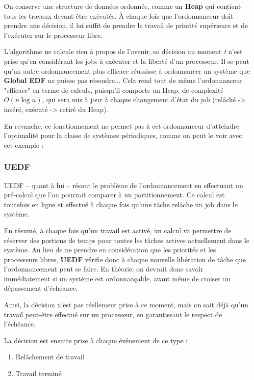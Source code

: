 		
		On conserve une structure de données 
		ordonnée, comme un \textbf{Heap}  qui contient tous les travaux
		devant être exécutés. À chaque fois que l'ordonnanceur doit prendre 
		une décision, il lui suffit de prendre le travail de priorité supérieure et 
		de l'exécuter sur le processeur libre.
		
		L'algorithme ne calcule rien à propos de l'avenir, sa décision au moment \textit{t}
		n'est prise qu'en considérant les jobs à exécuter et la liberté d'un 
		processeur. Il se peut qu'un autre ordonnancement plus efficace 
		réussisse à ordonnancer un système que \textbf{Global EDF} ne puisse pas résoudre...
		Cela rend tout de même l'ordonnanceur "efficace" en terme de calculs, 
		puisqu'il comporte un Heap, de complexité $O(n\log n)$, qui sera mis à jour 
		à chaque changement d'état du job (relâché -> inséré, 
		exécuté -> retiré du Heap).
		
		En revanche, ce fonctionnement ne permet pas à cet ordonnanceur d'atteindre 
		l'optimalité pour la classe de systèmes périodiques, comme on peut le voir 
		avec cet exemple :

		\subsubsection{UEDF}
		UEDF -- quant à lui -- résout le problème de l'ordonnancement en effectuant un pré-calcul 
		que l'on pourrait comparer à un partitionnement. Ce calcul est toutefois en ligne et 
		effectué à chaque fois qu'une tâche relâche un job dans le système.
		
		En résumé, à chaque fois qu'un travail est activé, un calcul va permettre 
		de réserver des portions de temps pour toutes les tâches actives 
		actuellement dans le système. Au lieu de ne prendre en considération que 
		les priorités et les processeurs libres, \textbf{UEDF }vérifie donc à 
		chaque nouvelle libération de tâche que l'ordonnancement peut se faire. 
		En théorie, on devrait donc savoir immédiatement si un système est ordonnançable, 
		avant même de croiser un dépassement d'échéance. 
		
		Ainsi, la décision n'est pas réellement prise à ce moment, 
		mais on sait déjà qu'un travail peut-être effectué sur un 
		processeur, en garantissant le respect de l'échéance.
		
		La décision est ensuite prise à chaque événement de ce type :
		\begin{enumerate}
			\item Relâchement de travail
			\item Travail terminé
		\end{enumerate}

